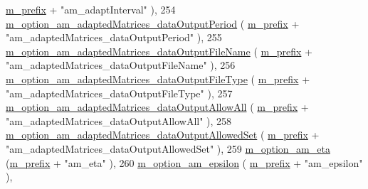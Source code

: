\begin{DoxyCode}
      \hyperlink{class_q_u_e_s_o_1_1_metropolis_hastings_s_g_options_a4f7c510aaa530336d24259e2a89f5d0b}{m\_prefix} + \textcolor{stringliteral}{"am\_adaptInterval"}                          ),
254   \hyperlink{class_q_u_e_s_o_1_1_metropolis_hastings_s_g_options_ac9a445e5def0140cc6cda1288bce2766}{m\_option\_am\_adaptedMatrices\_dataOutputPeriod}       (
      \hyperlink{class_q_u_e_s_o_1_1_metropolis_hastings_s_g_options_a4f7c510aaa530336d24259e2a89f5d0b}{m\_prefix} + \textcolor{stringliteral}{"am\_adaptedMatrices\_dataOutputPeriod"}       ),
255   \hyperlink{class_q_u_e_s_o_1_1_metropolis_hastings_s_g_options_a50b5f394825d9c8848d11bd7636e2b5c}{m\_option\_am\_adaptedMatrices\_dataOutputFileName}     (
      \hyperlink{class_q_u_e_s_o_1_1_metropolis_hastings_s_g_options_a4f7c510aaa530336d24259e2a89f5d0b}{m\_prefix} + \textcolor{stringliteral}{"am\_adaptedMatrices\_dataOutputFileName"}     ),
256   \hyperlink{class_q_u_e_s_o_1_1_metropolis_hastings_s_g_options_a0f0a406b0e8cce9d82a4534dfb45c23b}{m\_option\_am\_adaptedMatrices\_dataOutputFileType}     (
      \hyperlink{class_q_u_e_s_o_1_1_metropolis_hastings_s_g_options_a4f7c510aaa530336d24259e2a89f5d0b}{m\_prefix} + \textcolor{stringliteral}{"am\_adaptedMatrices\_dataOutputFileType"}     ),
257   \hyperlink{class_q_u_e_s_o_1_1_metropolis_hastings_s_g_options_ac45686ae902b17824aa18e6414fc9039}{m\_option\_am\_adaptedMatrices\_dataOutputAllowAll}     (
      \hyperlink{class_q_u_e_s_o_1_1_metropolis_hastings_s_g_options_a4f7c510aaa530336d24259e2a89f5d0b}{m\_prefix} + \textcolor{stringliteral}{"am\_adaptedMatrices\_dataOutputAllowAll"}     ),
258   \hyperlink{class_q_u_e_s_o_1_1_metropolis_hastings_s_g_options_a850b7d178f40d3afbfc2e82cbbcaf25f}{m\_option\_am\_adaptedMatrices\_dataOutputAllowedSet}   (
      \hyperlink{class_q_u_e_s_o_1_1_metropolis_hastings_s_g_options_a4f7c510aaa530336d24259e2a89f5d0b}{m\_prefix} + \textcolor{stringliteral}{"am\_adaptedMatrices\_dataOutputAllowedSet"}   ),
259   \hyperlink{class_q_u_e_s_o_1_1_metropolis_hastings_s_g_options_af33c4f035c1e61c9c2109621ee2c61df}{m\_option\_am\_eta}                                    (\hyperlink{class_q_u_e_s_o_1_1_metropolis_hastings_s_g_options_a4f7c510aaa530336d24259e2a89f5d0b}{m\_prefix} + \textcolor{stringliteral}{"am\_eta"}           
                               ),
260   \hyperlink{class_q_u_e_s_o_1_1_metropolis_hastings_s_g_options_a7a7a303ed2fc5905cb58a42ea53c1d66}{m\_option\_am\_epsilon}                                (
      \hyperlink{class_q_u_e_s_o_1_1_metropolis_hastings_s_g_options_a4f7c510aaa530336d24259e2a89f5d0b}{m\_prefix} + \textcolor{stringliteral}{"am\_epsilon"}                                ),

\end{DoxyCode}
